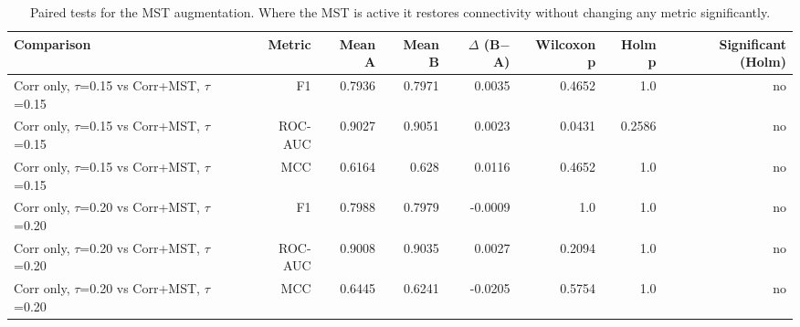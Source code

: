 \begin{table}[t]
\centering
\caption{Paired tests for the MST augmentation. Where the MST is active it restores connectivity without changing any metric significantly.}
\label{tab:msttaustats}
\footnotesize
\begin{tabular}{lrrrrrrr}
\toprule
Comparison & Metric & Mean A & Mean B & $\Delta$ (B$-$A) & Wilcoxon p & Holm p & Significant (Holm) \\
\midrule
Corr only, $\tau$=0.15 vs Corr+MST, $\tau$=0.15 & F1 & 0.7936 & 0.7971 & 0.0035 & 0.4652 & 1.0 & no \\
Corr only, $\tau$=0.15 vs Corr+MST, $\tau$=0.15 & ROC-AUC & 0.9027 & 0.9051 & 0.0023 & 0.0431 & 0.2586 & no \\
Corr only, $\tau$=0.15 vs Corr+MST, $\tau$=0.15 & MCC & 0.6164 & 0.628 & 0.0116 & 0.4652 & 1.0 & no \\
Corr only, $\tau$=0.20 vs Corr+MST, $\tau$=0.20 & F1 & 0.7988 & 0.7979 & -0.0009 & 1.0 & 1.0 & no \\
Corr only, $\tau$=0.20 vs Corr+MST, $\tau$=0.20 & ROC-AUC & 0.9008 & 0.9035 & 0.0027 & 0.2094 & 1.0 & no \\
Corr only, $\tau$=0.20 vs Corr+MST, $\tau$=0.20 & MCC & 0.6445 & 0.6241 & -0.0205 & 0.5754 & 1.0 & no \\
\bottomrule
\end{tabular}
\end{table}
